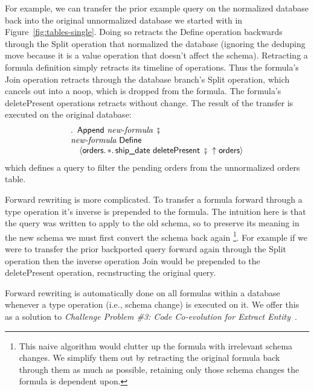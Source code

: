 \documentclass[english,submission]{programming}
\theoremstyle{definition}
\DeclareMathOperator{\exec}{\ \fatsemi\ \ }
\begin{document}
For example, we can transfer the prior example query on the normalized database back into the original unnormalized database we started with in Figure~\ref{fig:tables-single}. Doing so retracts the \textsf{Define} operation backwards through the \textsf{Split} operation that normalized the database (ignoring the deduping \textsf{move} because it is a value operation that doesn't affect the schema). Retracting a formula definition simply retracts its timeline of operations. Thus the formula's \textsf{Join} operation retracts through the database branch's \textsf{Split} operation, which cancels out into a \textsf{noop}, which is dropped from the formula. The formula's \textsf{deletePresent} operations retracts without change. The result of the transfer is executed on the original database:
\[
\begin{array}{l}
  \ldotp \textsf{ Append } \textit{new-formula} \exec\\
  \textit{new-formula} \textsf{ Define } \\
  \quad \langle
\textsf{orders}\ldotp * \ldotp \textsf{ship\_date deletePresent} \exec
\!\!\uparrow \textsf{orders}
  \rangle\\
\end{array}
\]
which defines a query to filter the pending orders from the unnormalized orders table.

Forward rewriting is more complicated. To transfer a formula forward through a type operation it's inverse is prepended to the formula. The intuition here is that the query was written to apply to the old schema, so to preserve its meaning in the new schema we must first convert the schema back again
\footnote{This naive algorithm would clutter up the formula with irrelevant schema changes. We simplify them out by retracting the original formula back through them as much as possible, retaining only those schema changes the formula is dependent upon.}.
For example if we were to transfer the prior backported query forward again through the \textsf{Split} operation then the inverse operation \textsf{Join} would be prepended to the \textsf{deletePresent} operation, recnstructing the original query.

Forward rewriting is automatically done on all formulas within a database whenever a type operation (i.e., schema change) is executed on it. We offer this as a solution to \textit{Challenge Problem \#3: Code Co-evolution for Extract Entity}~\cite{challenge-problems}.


\end{document}
